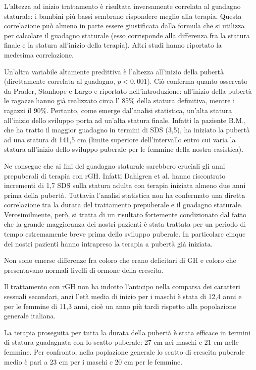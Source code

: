 L'altezza ad inizio trattamento è risultata inversamente correlata al guadagno staturale: i bambini più bassi sembrano rispondere meglio alla terapia. Questa correlazione può almeno in parte essere giustificata dalla formula che si utilizza per calcolare il guadagno staturale (esso corrisponde alla differenza fra la statura finale e la statura all'inizio della terapia). Altri studi hanno riportato la medesima correlazione\cite{de2005growth}. \cite{de2000growth}

Un'altra variabile altamente predittiva è l'altezza all'inizio della pubertà (direttamente correlata al guadagno, $p < 0,001$). Ciò conferma quanto osservato da Prader, Stanhope e Largo  e riportato nell'introduzione: 
 all'inizio della pubertà le ragazze hanno già realizzato circa l' 85\% della statura definitiva, mentre i ragazzi il 90\%. Pertanto, come emerge dal'analisi statistica, un'alta statura all'inizio dello sviluppo porta ad un'alta statura finale. Infatti la paziente B.M., che ha tratto il maggior guadagno in termini di SDS (3,5), ha iniziato la pubertà ad una statura di 141,5 cm (limite superiore dell'intervallo entro cui varia la statura all'inizio dello sviluppo puberale per le femmine della nostra casistica). 

Ne consegue che ai fini del guadagno staturale sarebbero cruciali gli anni prepuberali di terapia con rGH. Infatti Dahlgren et al. hanno riscontrato incrementi di 1,7 SDS sulla statura adulta con terapia iniziata almeno due anni prima della pubertà\cite{dahlgren2005final}. Tuttavia l'analisi statistica non ha confermato una diretta correlazione tra la durata del trattamento prepuberale e il guadagno staturale. Verosimilmente, però, si tratta di un risultato fortemente condizionato dal fatto che la grande maggioranza dei nostri pazienti è stata trattata per un periodo di tempo estremamente breve prima dello sviluppo puberale. In particolare cinque dei nostri pazienti hanno intrapreso la terapia a pubertà già iniziata.

Non sono emerse differenze fra coloro che erano deficitari di GH  e coloro che presentavano normali livelli di ormone della crescita.

Il trattamento con rGH non ha indotto l'anticipo nella comparsa dei caratteri sessuali secondari, anzi l'età media di inizio per i maschi è stata di 12,4 anni e per le femmine di 11,3 anni, cioè un anno più tardi rispetto alla popolazione generale italiana\cite{benso1989distribution}.

La terapia proseguita per tutta la durata della pubertà è stata efficace in termini di statura guadagnata con lo scatto puberale: 27 cm nei maschi e 21 cm nelle femmine. Per confronto, nella poplazione generale lo scatto di crescita puberale medio è pari a 23 cm per i maschi e 20 cm per le femmine\cite{tanner1990foetus}. 

